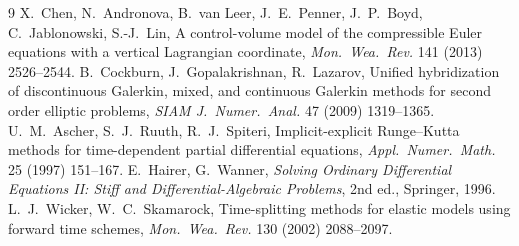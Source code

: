 \documentclass[11pt,a4paper]{article}
\begin{document}
\begin{thebibliography}{9}
 X.~Chen, N.~Andronova, B.~van Leer, J.~E.~Penner, J.~P.~Boyd, C.~Jablonowski,
S.-J.~Lin, A control-volume model of the compressible Euler equations with a vertical Lagrangian
coordinate, \emph{Mon.\ Wea.\ Rev.} 141 (2013) 2526--2544.
 B.~Cockburn, J.~Gopalakrishnan, R.~Lazarov, Unified hybridization of
discontinuous Galerkin, mixed, and continuous Galerkin methods for second order elliptic
problems, \emph{SIAM J.\ Numer.\ Anal.} 47 (2009) 1319--1365.
 U.~M.~Ascher, S.~J.~Ruuth, R.~J.~Spiteri, Implicit-explicit Runge--Kutta methods for
time-dependent partial differential equations, \emph{Appl.\ Numer.\ Math.} 25 (1997) 151--167.
 E.~Hairer, G.~Wanner, \emph{Solving Ordinary Differential Equations II: Stiff and
Differential-Algebraic Problems}, 2nd ed., Springer, 1996.
 L.~J.~Wicker, W.~C.~Skamarock, Time-splitting methods for elastic models using
forward time schemes, \emph{Mon.\ Wea.\ Rev.} 130 (2002) 2088--2097.
\end{thebibliography}
\end{document}
